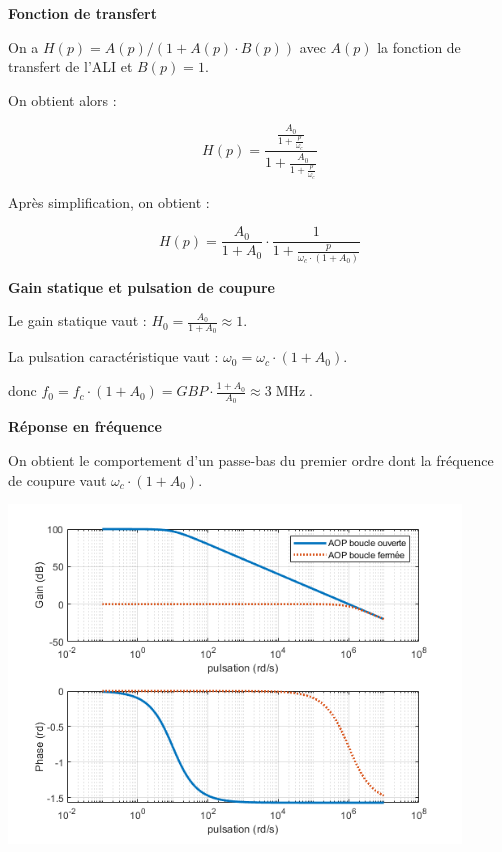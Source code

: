 \documentclass[a4paper,french]{paper}
\begin{document}
\textbf{Fonction de transfert} 

On a $H(p) = A(p) / (1 + A(p) \cdot B(p))$ avec $A(p)$ la fonction de transfert de l'ALI et $B(p) = 1$.
		
On obtient alors : 
		
$$H(p) = \frac{\frac{A_0}{1 + \frac{p}{\omega_c}}}{1 + \frac{A_0}{1 + \frac{p}{\omega_c}}}$$
		
Après simplification, on obtient : 
		
$$H(p) = \frac{A_0}{1 + A_0} \cdot \frac{1}{1 + \frac{p}{\omega_c \cdot (1 + A_0)}}$$


\textbf{Gain statique et pulsation de coupure}

Le gain statique vaut : $H_0 = \frac{A_0}{1 + A_0} \approx 1$.
		
La pulsation caractéristique vaut : $\omega_0 = \omega_c \cdot (1 + A_0)$. 
		
donc $f_0 = f_c \cdot (1 + A_0) = GBP \cdot \frac{1 + A_0}{A_0} \approx 3\operatorname{MHz}$.


\textbf{Réponse en fréquence}

On obtient le comportement d'un passe-bas du premier ordre dont la fréquence de coupure vaut $\omega_c \cdot (1 + A_0)$. 

\begin{center}
	\includegraphics[width=12cm]{images/TD/correction_ALI_BFunit_Bode.png}
\end{center}
\end{document}
